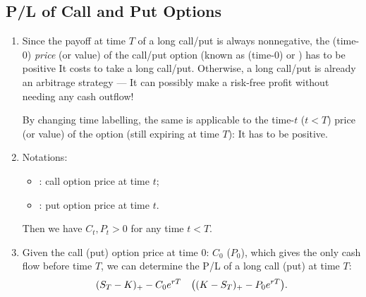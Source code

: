 \subsection{P/L of Call and Put Options}
\begin{enumerate}
\item Since the payoff at time \(T\) of a long call/put is always nonnegative,
the (time-0) \emph{price} (or value) of the call/put option (known as (time-0)
 or ) has to be positive
 It costs  to take a long call/put.
Otherwise, a long call/put is already an arbitrage strategy --- It can possibly
make a risk-free profit without needing any cash outflow!

\begin{note}
By changing time labelling, the same is applicable to the time-\(t\) (\(t<T\))
price (or value) of the option (still expiring at time \(T\)): It has to be positive.
\end{note}

\item Notations:
\begin{itemize}
\item {}: call option price at time \(t\);
\item {}: put option price at time \(t\).
\end{itemize}
Then we have \(C_t,P_t>0\) for any time \(t<T\).

\item \label{it:lc-lp-pnl}
Given the call (put) option price at time 0: \(C_0\) (\(P_0\)), which gives the
only cash flow before time \(T\), we can determine the P/L of a long call (put)
at time \(T\):
\[
(S_T-K)_{+}-C_0e^{rT}\quad\qty((K-S_T)_{+}-P_0e^{rT}).
\]


\end{enumerate}

